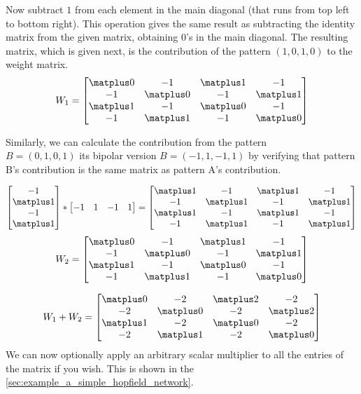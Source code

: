 Now subtract $1$ from each element in the main diagonal (that runs from top left
to bottom right). This operation gives the same result as subtracting the
identity matrix from the given matrix, obtaining $0$’s in the main diagonal. The
resulting matrix, which is given next, is the contribution of the pattern $(1, 0, 1,
0)$ to the weight matrix.
\[
 W_1 = \begin{bmatrix}
 \matplus0 & -1 &  \matplus1 & -1 \\
-1 &  \matplus0 & -1 &  \matplus1 \\
 \matplus1 & -1 &  \matplus0 & -1 \\
-1 &  \matplus1 & -1 &  \matplus0 \\
\end{bmatrix}
\]

Similarly, we can calculate the contribution from the pattern \\ $B = (0, 1, 0, 1)$ its bipolar version $B = (-1, 1, -1, 1)$ by verifying that pattern B's contribution is the same matrix as pattern A's contribution.

\[ 
\begin{bmatrix}
 -1  \\
  \matplus1  \\
 -1  \\
  \matplus1  \\
\end{bmatrix}
*
\begin{bmatrix}
 -1 & 1 & -1 & 1  \\
\end{bmatrix}
=
\begin{bmatrix}
 \matplus1 & -1 &  \matplus1 & -1 \\
-1 &  \matplus1 & -1 &  \matplus1 \\
 \matplus1 & -1 &  \matplus1 & -1 \\
-1 &  \matplus1 & -1 &  \matplus1 \\
\end{bmatrix}
\]
\[
W_2 =
\begin{bmatrix}
 \matplus0 & -1 &  \matplus1 & -1 \\
-1 &  \matplus0 & -1 &  \matplus1 \\
 \matplus1 & -1 &  \matplus0 & -1 \\
-1 &  \matplus1 & -1 &  \matplus0 \\
\end{bmatrix}
\]

\[
W_1 + W_2 =
\begin{bmatrix}
 \matplus0 & -2 &  \matplus2 & -2 \\
-2 &  \matplus0 & -2 &  \matplus2 \\
 \matplus1 & -2 &  \matplus0 & -2 \\
-2 &  \matplus1 & -2 &  \matplus0 \\
\end{bmatrix}
\]
We can now optionally apply an arbitrary scalar multiplier to all the entries of
the matrix if you wish. This is shown in the \ref{sec:example_a_simple_hopfield_network}.
